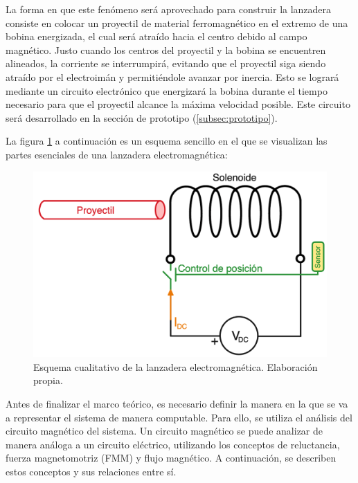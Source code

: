 La forma en que este fenómeno será aprovechado para construir la lanzadera consiste en colocar un proyectil de material ferromagnético en el extremo de una bobina energizada, el cual será atraído hacia el centro debido al campo magnético. Justo cuando los centros del proyectil y la bobina se encuentren alineados, la corriente se interrumpirá, evitando que el proyectil siga siendo atraído por el electroimán y permitiéndole avanzar por inercia. Esto se logrará mediante un circuito electrónico que energizará la bobina durante el tiempo necesario para que el proyectil alcance la máxima velocidad posible. Este circuito será desarrollado en la sección de prototipo (\ref{subsec:prototipo}).

La figura \ref{fig:esquemabasico} a continuación es un esquema sencillo en el que se visualizan las partes esenciales de una lanzadera electromagnética:

\begin{figure}[H]
    \centering %
    \includegraphics[width=13cm]{FigurasMemoria/esquemabasico.png}
    \caption{Esquema cualitativo de la lanzadera electromagnética. Elaboración propia.}
    \label{fig:esquemabasico} %
\end{figure}

Antes de finalizar el marco teórico, es necesario definir la manera en la que se va a representar el sistema de manera computable. Para ello, se utiliza el análisis del circuito magnético del sistema. Un circuito magnético se puede analizar de manera análoga a un circuito eléctrico, utilizando los conceptos de reluctancia, fuerza magnetomotriz (FMM) y flujo magnético. A continuación, se describen estos conceptos y sus relaciones entre sí.

